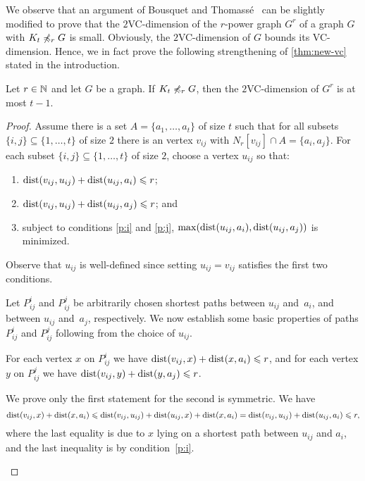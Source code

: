 We observe that an argument of Bousquet and 
Thomass\'e~\cite{BousquetT15} can be slightly modified to prove that 
the $2$VC-dimension of the $r$-power graph $G^r$ of a graph $G$
with $K_t\not\preccurlyeq_r G$ is small. Obviously, the $2$VC-dimension of $G$
bounds its VC-dimension. Hence, we in fact prove the following strengthening of \cref{thm:new-vc} stated in the introduction. 

\begin{theorem}
Let $r\in \mathbb{N}$ and let $G$ be a graph. 
If $K_t\not\preccurlyeq_r G$, then the $2$VC-dimension of $G^r$
is at most $t-1$. 
\end{theorem}
\begin{proof}
Assume there is a set $A=\{a_1,\ldots, a_t\}$ of size $t$ such that
for all subsets $\{i,j\}\subseteq \{1,\ldots,t\}$ of size $2$ 
there is an vertex $v_{ij}$ with 
$N_r[v_{ij}]\cap A=\{a_i,a_j\}$.
For each subset $\{i,j\}\subseteq \{1,\ldots,t\}$ of size $2$, choose a vertex $u_{ij}$ so that:
\begin{enumerate}[(1)]
\item\label{p:i} $\mathrm{dist}(v_{ij},u_{ij})+\mathrm{dist}(u_{ij},a_i)\leqslant r$;
\item\label{p:j} $\mathrm{dist}(v_{ij},u_{ij})+\mathrm{dist}(u_{ij},a_j)\leqslant r$; and
\item\label{p:min} subject to conditions \eqref{p:i} and \eqref{p:j}, $\max(\mathrm{dist}(u_{ij},a_i),\mathrm{dist}(u_{ij},a_j))$ is minimized.
\end{enumerate}
Observe that $u_{ij}$ is well-defined since setting $u_{ij}=v_{ij}$ satisfies the first two conditions.

Let $P^i_{ij}$ and $P^j_{ij}$ be arbitrarily chosen shortest paths between $u_{ij}$ and~$a_i$, and between $u_{ij}$ and~$a_j$, respectively.
We now establish some basic properties of paths $P^i_{ij}$ and $P^j_{ij}$ following from the choice of $u_{ij}$.

\begin{claim}\label{cl:ineq}
For each vertex $x$ on $P^i_{ij}$ we have $\mathrm{dist}(v_{ij},x)+\mathrm{dist}(x,a_i)\leqslant r$, and
for each vertex $y$ on $P^j_{ij}$ we have $\mathrm{dist}(v_{ij},y)+\mathrm{dist}(y,a_j)\leqslant r$.
\end{claim}
\begin{clproof}
We prove only the first statement for the second is symmetric.
We have
$$\mathrm{dist}(v_{ij},x)+\mathrm{dist}(x,a_{i})\leqslant \mathrm{dist}(v_{ij},u_{ij})+\mathrm{dist}(u_{ij},x)+\mathrm{dist}(x,a_{i})=\mathrm{dist}(v_{ij},u_{ij})+\mathrm{dist}(u_{ij},a_{i})\leqslant r,$$
where the last equality is due to $x$ lying on a shortest path between $u_{ij}$ and $a_i$, and the last inequality is by condition~\eqref{p:i}.
\end{clproof}


\end{proof}
